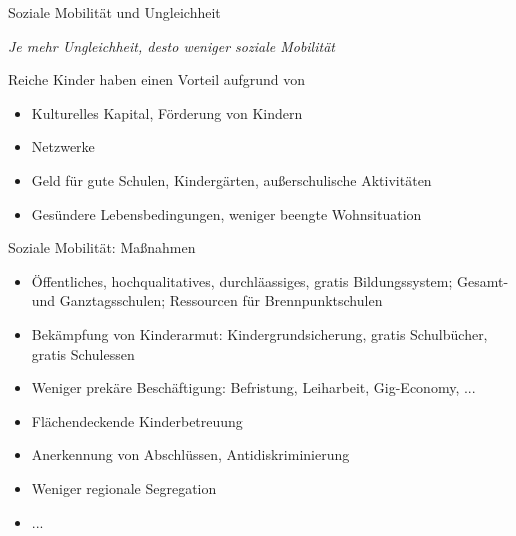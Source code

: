 \documentclass[aspectratio=169,xcolor=dvipsnames]{beamer}
\begin{document}
\begin{frame}[label = soziale-mobilitaet-2]{Soziale Mobilität und Ungleichheit}

    \begin{center}
        \textit{Je mehr Ungleichheit, desto weniger soziale Mobilität} \\
        \hyperlink{great-gatsby-curve}{}
    \end{center}

    \vspace{0.5cm}
    \pause
    Reiche Kinder haben einen Vorteil aufgrund von
    \begin{itemize}
        \item Kulturelles Kapital, Förderung von Kindern
        \item Netzwerke
        \item Geld für gute Schulen, Kindergärten, außerschulische Aktivitäten
        \item Gesündere Lebensbedingungen, weniger beengte Wohnsituation
    \end{itemize}
\end{frame}

\begin{frame}{Soziale Mobilität: Maßnahmen}
    \begin{itemize}
        \item Öffentliches, hochqualitatives, durchläassiges, gratis Bildungssystem; Gesamt- und Ganztagsschulen; Ressourcen für Brennpunktschulen
        \item Bekämpfung von Kinderarmut: Kindergrundsicherung, gratis Schulbücher, gratis Schulessen
        \item Weniger prekäre Beschäftigung: Befristung, Leiharbeit, Gig-Economy, ...
        \item Flächendeckende Kinderbetreuung
        \item Anerkennung von Abschlüssen, Antidiskriminierung
        \item Weniger regionale Segregation
        \item ...
    \end{itemize}    
\end{frame}
\end{document}
